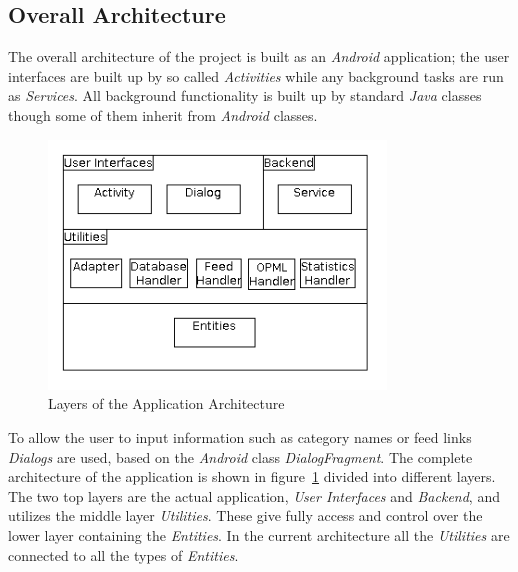\subsection{Overall Architecture}
\label{sec:overall_architecture}
The overall architecture of the project is built as an \textit{Android} application; the user interfaces are built up by so called \textit{Activities} while any background tasks are run as \textit{Services}. All background functionality is built up by standard \textit{Java} classes though some of them inherit from \textit{Android} classes.
\begin{figure}[hbt]
\centering
\includegraphics[width=0.8\textwidth]{./images/ApplicationLayers.png}
\caption{Layers of the Application Architecture}
\label{fig:app_layers}
\end{figure}
To allow the user to input information such as category names or feed links \textit{Dialogs} are used, based on the \textit{Android} class \textit{DialogFragment}. The complete architecture of the application is shown in figure~\ref{fig:app_layers} divided into different layers. The two top layers are the actual application, \textit{User Interfaces} and \textit{Backend}, and utilizes the middle layer \textit{Utilities}. These give fully access and control over the lower layer containing the \textit{Entities}. In the current architecture all the \textit{Utilities} are connected to all the types of \textit{Entities}. 
